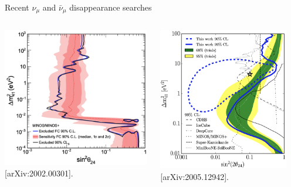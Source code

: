 \begin{frame}[t]{Recent $\nu_{\mu}$ and $\bar{\nu}_{\mu}$ disappearance searches}

\begin{columns}
  \begin{column}{0.50\textwidth}
   \centering
    \includegraphics[width=0.99\textwidth]{./images/beyond3nu/minos_sterile_disapp_recent}\\
    {\color{blue}[arXiv:2002.00301]}.
  \end{column}
  \begin{column}{0.50\textwidth}
    \centering
     \includegraphics[width=0.90\textwidth]{./images/beyond3nu/icecube_sterile_disapp_recent}\\
     {\color{blue}[arXiv:2005.12942]}.
  \end{column}
\end{columns}
\end{frame}

